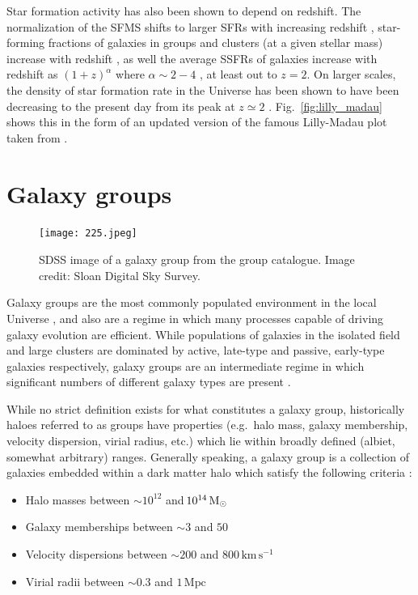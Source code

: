 Star formation activity has also been shown to depend on redshift.
The normalization of the SFMS shifts to larger SFRs with increasing
redshift \citep{karim2011, whitaker2012, lee2015, erfanianfar2016},
star-forming fractions of galaxies in groups and clusters (at a given
stellar mass) increase with redshift \citep{mcgee2011, hou2013,
  nantais2013}, as well the average SSFRs of galaxies increase with
redshift as $(1+z)^\alpha$ where $\alpha \sim 2-4$
\citep{oliver2010, whitaker2012}, at least out to $z=2$.  On larger
scales, the density of star formation rate in the Universe has been
shown to have been decreasing to the present day from its peak at $z
\simeq 2$ \citep[e.g.][]{madau1998, madau2014}.
Fig.~\ref{fig:lilly_madau} shows this in the form of an updated
version of the famous Lilly-Madau plot taken from \citet{madau2014}.

\section{Galaxy groups}
\label{sec:groups}

\begin{figure}[!ht]
  \centering
  \texttt{[image: 225.jpeg]}
  \caption[SDSS image of a galaxy group from the \citet{yang2007}
    group catalogue]{SDSS image of a galaxy group from the \citet{yang2007}
    group catalogue.  Image credit: Sloan Digital Sky Survey.}
  \label{fig:sdss_225}
\end{figure}

Galaxy groups are the most commonly populated environment in the local
Universe \citep{geller1983, eke2005}, and also are a regime in which
many processes capable of driving galaxy evolution are efficient.
While populations of galaxies in the isolated field and large clusters are
dominated by active, late-type and passive, early-type galaxies
respectively, galaxy groups are an intermediate regime in which
significant numbers of different galaxy types are present
\citep{wilman2005, mcgee2011}.
\par
While no strict definition exists for what constitutes a galaxy
group, historically haloes referred to as groups have properties
(e.g.\ halo mass, galaxy membership, velocity dispersion, virial
radius, etc.) which lie within broadly defined (albiet, somewhat
arbitrary) ranges.  Generally
speaking, a galaxy group is a collection of galaxies embedded within a
dark matter halo which satisfy the following criteria
\citep{mamon2007, connelly2012}:

\begin{itemize}
  \item Halo masses between $\sim\!10^{12}$ and $\!10^{14}\,\mathrm{M_{\odot}}$

  \item Galaxy memberships between $\sim\!3$ and $50$

  \item Velocity dispersions between $\sim\!200$ and
    $800\,\mathrm{km}\,\mathrm{s^{-1}}$
  
  \item Virial radii between $\sim\! 0.3$ and $1\,\mathrm{Mpc}$
\end{itemize}

